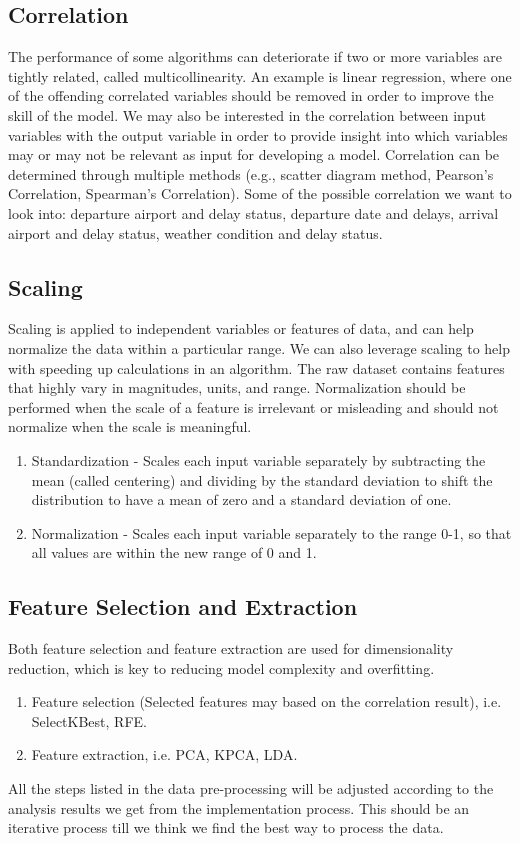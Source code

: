 \documentclass{article}
\begin{document}
\subsection{Correlation}
The performance of some algorithms can deteriorate if two or more variables are tightly related, called multicollinearity. An example is linear regression, where one of the offending correlated variables should be removed in order to improve the skill of the model. We may also be interested in the correlation between input variables with the output variable in order to provide insight into which variables may or may not be relevant as input for developing a model. 
Correlation can be determined through multiple methods (e.g., scatter diagram method, Pearson's Correlation, Spearman's Correlation).
Some of the possible correlation we want to look into: departure airport and delay status, departure date and delays, arrival airport and delay status, weather condition and delay status.

\subsection{Scaling}
Scaling is applied to independent variables or features of data, and can help normalize the data within a particular range. We can also leverage scaling to help with speeding up calculations in an algorithm. The raw dataset contains features that highly vary in magnitudes, units, and range. Normalization should be performed when the scale of a feature is irrelevant or misleading and should not normalize when the scale is meaningful.
\begin{enumerate}
\itemsep0em
\item Standardization - Scales each input variable separately by subtracting the mean (called centering) and dividing by the standard deviation to shift the distribution to have a mean of zero and a standard deviation of one.
\item Normalization - Scales each input variable separately to the range 0-1, so that all values are within the new range of 0 and 1.
\end{enumerate}

\subsection{Feature Selection and Extraction}
Both feature selection and feature extraction are used for dimensionality reduction, which is key to reducing model complexity and overfitting.
\begin{enumerate}
\itemsep0em
\item Feature selection (Selected features may based on the correlation result), i.e. SelectKBest, RFE.
\item Feature extraction, i.e. PCA, KPCA, LDA.
\end{enumerate}
All the steps listed in the data pre-processing will be adjusted according to the analysis results we get from the implementation process. This should be an iterative process till we think we find the best way to process the data.
\end{document}
